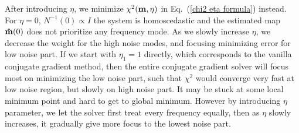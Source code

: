 \documentclass[11pt, letterpaper]{article}
\newcommand{\vbm}{\vb{m}}
\newcommand{\hatm}{\vb{\hat{m}}}
\begin{document}
After introducing $\eta$, we minimize
$\chi^2(\vbm,\eta)$ in Eq.~(\ref{chi2 eta formula}) instead.
For $\eta=0$, $N^{-1}(0) \propto I$ the system is homoscedastic and the estimated map $\hatm(0)$
does not prioritize any frequency mode.
As we slowly increase $\eta$, we decrease the weight for the high noise modes,
and focusing minimizing error for low noise part.
If we start with $\eta_1=1$ directly, which corresponds to the vanilla conjugate
gradient method, then the entire conjugate gradient solver
will focus most on minimizing the low noise part, such that $\chi^2$ would
converge very fast at low noise region, but slowly on high noise part.
It may be stuck at some local minimum point and hard to get to global minimum.
However by introducing $\eta$ parameter, we let the solver first treat every
frequency equally,
then as $\eta$ slowly increases, it gradually give more focus to the lowest noise part.
\end{document}
